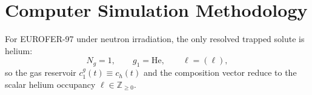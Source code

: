 %

\section{Computer Simulation Methodology}
\label{sec:simulations}

For \textsc{EUROFER-97} under neutron irradiation, the only resolved
trapped solute is helium:
\begin{equation}
   N_g = 1, \qquad g_1 = \mathrm{He}, \qquad
   \boldsymbol{\ell} = (\ell),
   \label{eq:eurofer_gas_list}
\end{equation}
so the gas reservoir $c^g_1(t)\equiv c_h(t)$ and the composition
vector reduce to the scalar helium occupancy $\ell\in\mathbb{Z}_{\geq 0}$.

